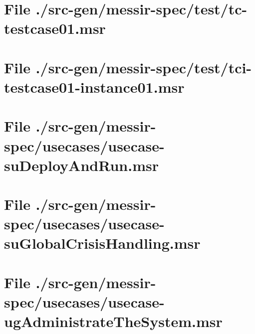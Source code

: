 \section[File /src-gen/messir-spec/test/tc-testcase01.msr]{File ./src-gen/messir-spec/test/tc-testcase01.msr}
\scriptsize

\normalsize
	
\section[File /src-gen/messir-spec/test/tci-testcase01-instance01.msr]{File ./src-gen/messir-spec/test/tci-testcase01-instance01.msr}
\scriptsize

\normalsize
	
\section[File /src-gen/messir-spec/usecases/usecase-suDeployAndRun.msr]{File ./src-gen/messir-spec/usecases/usecase-suDeployAndRun.msr}
\scriptsize

\normalsize
	
\section[File /src-gen/messir-spec/usecases/usecase-suGlobalCrisisHandling.msr]{File ./src-gen/messir-spec/usecases/usecase-suGlobalCrisisHandling.msr}
\scriptsize

\normalsize
	
\section[File /src-gen/messir-spec/usecases/usecase-ugAdministrateTheSystem.msr]{File ./src-gen/messir-spec/usecases/usecase-ugAdministrateTheSystem.msr}
\scriptsize

\normalsize
	
